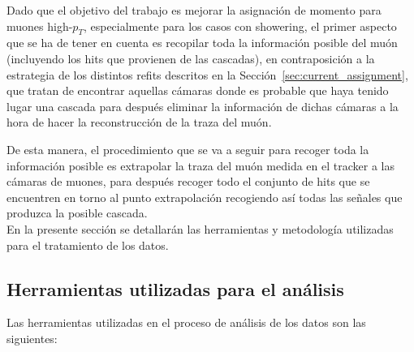 
Dado que el objetivo del trabajo es mejorar la asignaci\'on de momento para muones high-$p_{T}$, especialmente para los casos con showering, el primer aspecto que se ha de tener en cuenta es recopilar toda la informaci\'on posible del mu\'on (incluyendo los hits que provienen de las cascadas), en contraposici\'on a la estrategia de los distintos refits descritos en la Secci\'on~\ref{sec:current_assignment}, que tratan de encontrar aquellas c\'amaras donde es probable que haya tenido lugar una cascada para despu\'es eliminar la informaci\'on de dichas c\'amaras a la hora de hacer la reconstrucci\'on de la traza del mu\'on.

De esta manera, el procedimiento que se va a seguir para recoger toda la informaci\'on posible es extrapolar la traza del mu\'on medida en el tracker a las c\'amaras de muones, para despu\'es recoger todo el conjunto de hits que se encuentren en torno al punto extrapolaci\'on recogiendo as\'i todas las señales que produzca la posible cascada. \\

En la presente secci\'on se detallar\'an las herramientas y metodolog\'ia utilizadas para el tratamiento de los datos.


\subsection{Herramientas utilizadas para el an\'alisis}\label{sec:tools}

Las herramientas utilizadas en el proceso de an\'alisis de los datos son las siguientes:

